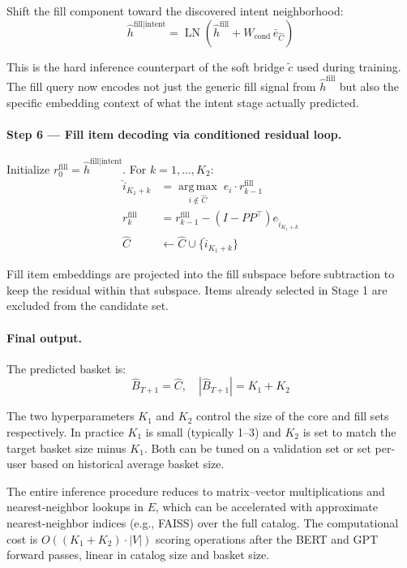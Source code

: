 \documentclass[conference]{IEEEtran}
\begin{document}
Shift the fill component toward the discovered intent neighborhood:
\begin{equation}
\hat{h}^{\text{fill} \mid \text{intent}}
  = \operatorname{LN}\!\left(\hat{h}^{\text{fill}}
    + W_{\text{cond}}\,\bar{e}_{\hat{C}}\right)
\end{equation}

This is the hard inference counterpart of the soft bridge $\tilde{c}$
used during training. The fill query now encodes not just the generic
fill signal from $\hat{h}^{\text{fill}}$ but also the specific
embedding context of what the intent stage actually predicted.

\paragraph{Step 6 --- Fill item decoding via conditioned residual loop.}
Initialize $r_0^{\text{fill}} = \hat{h}^{\text{fill} \mid \text{intent}}$.
For $k = 1, \ldots, K_2$:
\begin{align}
\hat{i}_{K_1+k} &= \operatorname*{arg\,max}_{i \notin \hat{C}}\;
                   e_i \cdot r_{k-1}^{\text{fill}} \\
r_k^{\text{fill}} &= r_{k-1}^{\text{fill}}
                   - (I - PP^\top) e_{\hat{i}_{K_1+k}} \\
\hat{C} &\leftarrow \hat{C} \cup \{\hat{i}_{K_1+k}\}
\end{align}

Fill item embeddings are projected into the fill subspace before
subtraction to keep the residual within that subspace. Items already
selected in Stage 1 are excluded from the candidate set.

\paragraph{Final output.}
The predicted basket is:
\begin{equation}
\hat{B}_{T+1} = \hat{C}, \quad |\hat{B}_{T+1}| = K_1 + K_2
\end{equation}

The two hyperparameters $K_1$ and $K_2$ control the size of the core
and fill sets respectively. In practice $K_1$ is small (typically
1--3) and $K_2$ is set to match the target basket size minus $K_1$.
Both can be tuned on a validation set or set per-user based on
historical average basket size.

The entire inference procedure reduces to matrix--vector multiplications
and nearest-neighbor lookups in $E$, which can be accelerated with
approximate nearest-neighbor indices (e.g., FAISS) over the full
catalog. The computational cost is $O((K_1 + K_2) \cdot |V|)$ scoring
operations after the BERT and GPT forward passes, linear in catalog
size and basket size.
\end{document}
